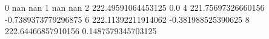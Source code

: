 0 nan nan
1 nan nan
2 222.49591064453125 0.0
4 221.75697326660156 -0.7389373779296875
6 222.11392211914062 -0.381988525390625
8 222.64466857910156 0.1487579345703125
